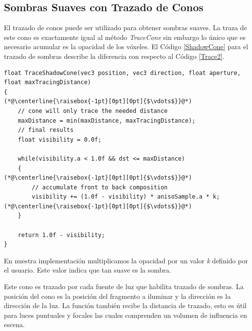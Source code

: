 \subsection{Sombras Suaves con Trazado de Conos} %
\label{sub:sombras_con_trazado_de_conos}
El trazado de conos puede ser utilizado para obtener sombras suaves. La traza de este cono es exactamente igual al método \emph{TraceCone} sin embargo lo único que es necesario acumular es la opacidad de los vóxeles. El Código \ref{ShadowCone} para el trazado de sombras describe la diferencia con respecto al Código \ref{Trace2}.
\\
\begin{lstlisting}[caption={Trazado de sombras con conos.}, label=ShadowCone]
float TraceShadowCone(vec3 position, vec3 direction, float aperture, float maxTracingDistance)
{
(*@\centerline{\raisebox{-1pt}[0pt][0pt]{$\vdots$}}@*)
    // cone will only trace the needed distance
    maxDistance = min(maxDistance, maxTracingDistance);
    // final results
    float visibility = 0.0f;
    
    while(visibility.a < 1.0f && dst <= maxDistance)
    {
(*@\centerline{\raisebox{-1pt}[0pt][0pt]{$\vdots$}}@*)
        // accumulate front to back composition
        visibility += (1.0f - visibility) * anisoSample.a * k;
(*@\centerline{\raisebox{-1pt}[0pt][0pt]{$\vdots$}}@*)
    }

    return 1.0f - visibility;
}
\end{lstlisting}
En nuestra implementación multiplicamos la opacidad por un valor \emph{k} definido por el usuario. Este valor indica que tan suave es la sombra.

Este cono es trazado por cada fuente de luz que habilita trazado de sombras. La posición del cono es la posición del fragmento a iluminar y la dirección es la dirección de la luz. La función también recibe la distancia de trazado, esto es útil para luces puntuales y focales las cuales comprenden un volumen de influencia en escena.

